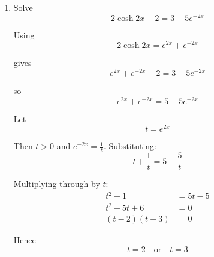 \documentclass[leqno]{article}
\begin{document}
\begin{enumerate}[
  label=\textbf{\arabic*.},
  leftmargin=*,
  topsep=0pt,
  partopsep=0pt,
  parsep=0pt
]
\begin{djsSolution}
\begin{enumerate}[label=\textbf{(\alph*)}]

$C_1$ is obtained from $y=\cosh x$ by a horizontal scale factor of $\tfrac12$, a vertical scale factor of $2$, and a translation down $2$ units. It meets both axes only at $(0,0)$ and has no asymptotes.

$C_2$ is the graph of $y=3-5e^{-2x}$. As \(x\to\infty\), \(e^{-2x}\to 0\), so \(y\to 3\). Hence \(C_2\) has horizontal asymptote \(y=3\).

$C_2$ meets the $y$-axis when $x=0$: $y = 3-5e^{-2(0)} = 3 - 5 =-2$. So the \(y\)-intercept is \((0,-2)\).

$C_2$ meets the $x$-axis when $3-5e^{-2x}=0$. Solving gives $x=\frac{1}{2}\ln\frac{5}{3}$, so the $x$-intercept is \[\left(\frac{1}{2}\ln\frac{5}{3}, 0\right)\] 


  \item Solve
\[
2\cosh 2x-2=3-5e^{-2x}
\]

Using
\[
2\cosh 2x=e^{2x}+e^{-2x}
\]

gives
\[
e^{2x}+e^{-2x}-2=3-5e^{-2x}
\]

so
\[
e^{2x}+e^{-2x}=5-5e^{-2x}
\]

Let
\[
t=e^{2x}
\]

Then \(t>0\) and \(e^{-2x}=\frac1t\). Substituting:
\[
t+\frac1t=5-\frac5t
\]

Multiplying through by \(t\):
\begin{align*}
t^2+1&=5t-5\\
t^2-5t+6&=0\\
(t-2)(t-3)&=0
\end{align*}

Hence
\[
t=2 \quad \text{or} \quad t=3
\]


\end{enumerate}
\end{djsSolution}
\end{enumerate}
\end{document}
